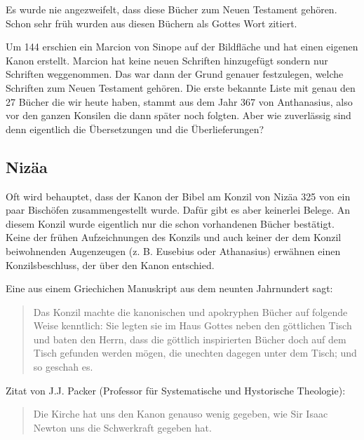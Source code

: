 Es wurde nie angezweifelt, dass diese Bücher zum Neuen Testament gehören. Schon sehr früh wurden aus diesen Büchern als Gottes Wort zitiert.

Um 144 \nChr{} erschien ein Marcion von Sinope auf der Bildfläche und hat einen eigenen Kanon erstellt.  Marcion hat keine neuen Schriften hinzugefügt sondern nur Schriften weggenommen. Das war dann der Grund genauer festzulegen, welche Schriften zum Neuen Testament gehören. Die erste bekannte Liste mit genau den 27 Bücher die wir heute haben, stammt aus dem Jahr 367 \vChr{} von Anthanasius, also vor den ganzen Konsilen die dann später noch folgten. Aber wie zuverlässig sind denn eigentlich die Übersetzungen und die Überlieferungen?

\subsection{Nizäa}
Oft wird behauptet, dass der Kanon der Bibel am Konzil von Nizäa 325 \nChr{} von ein paar Bischöfen zusammengestellt wurde. Dafür gibt es aber keinerlei Belege. An diesem Konzil wurde eigentlich nur die schon vorhandenen Bücher bestätigt. Keine der frühen Aufzeichnungen des Konzils und auch keiner der dem Konzil beiwohnenden Augenzeugen (z. B. Eusebius oder Athanasius) erwähnen einen Konzilsbeschluss, der über den Kanon entschied.

Eine aus einem Griechichen Manuskript aus dem neunten Jahrnundert sagt:
\begin{quote}
  Das Konzil machte die kanonischen und apokryphen Bücher auf folgende Weise kenntlich: Sie legten sie im Haus Gottes neben den göttlichen Tisch und baten den Herrn, dass die göttlich inspirierten Bücher doch auf dem Tisch gefunden werden mögen, die unechten dagegen unter dem Tisch; und so geschah es.
\end{quote}

Zitat von J.J. Packer (Professor für Systematische und Hystorische Theologie):
\begin{quote}
  Die Kirche hat uns den Kanon genauso wenig gegeben, wie Sir Isaac Newton uns die Schwerkraft gegeben hat.
\end{quote}

